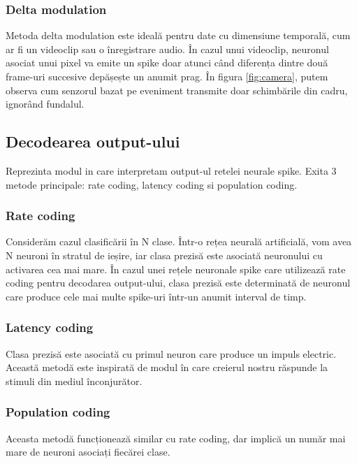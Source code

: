 \subsubsection{Delta modulation}

Metoda delta modulation este ideală pentru date cu dimensiune temporală, cum ar fi un videoclip sau o înregistrare audio. În cazul unui videoclip, neuronul asociat unui pixel va emite un spike doar atunci când diferența dintre două frame-uri succesive depășește un anumit prag. În figura \ref{fig:camera}, putem observa cum senzorul bazat pe eveniment transmite doar schimbările din cadru, ignorând fundalul.


\subsection{Decodearea output-ului}

Reprezinta modul in care interpretam output-ul retelei neurale spike. Exita 3 metode principale: rate coding, latency coding si population coding.


\subsubsection{Rate coding}

Considerăm cazul clasificării în N clase. Într-o rețea neurală artificială, vom avea N neuroni în stratul de ieșire, iar clasa prezisă este asociată neuronului cu activarea cea mai mare. În cazul unei rețele neuronale spike care utilizează rate coding pentru decodarea output-ului, clasa prezisă este determinată de neuronul care produce cele mai multe spike-uri într-un anumit interval de timp.


\subsubsection{Latency coding}

Clasa prezisă este asociată cu primul neuron care produce un impuls electric. Această metodă este inspirată de modul în care creierul nostru răspunde la stimuli din mediul înconjurător.

\subsubsection{Population coding}

Aceasta metodă funcționează similar cu rate coding, dar implică un număr mai mare de neuroni asociați fiecărei clase.


